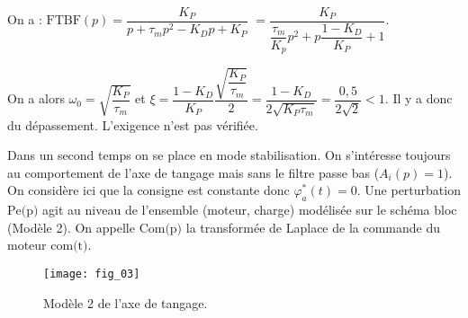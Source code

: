 \ifprof
\begin{corrige}
On a : $\text{FTBF}(p)=
\dfrac{K_P}{p+\tau_m p^2- K_Dp +K_P}$ 
$=\dfrac{K_P}{\dfrac{\tau_m}{K_p} p^2 + p\dfrac{1- K_D}{K_P} +1}$.

On a alors $\omega_0 = \sqrt{\dfrac{K_P}{\tau_m}}$ et $\xi = \dfrac{1- K_D}{K_P} \dfrac{\sqrt{\dfrac{K_P}{\tau_m}}}{2}= \dfrac{1- K_D}{2\sqrt{K_P \tau_m}}= \dfrac{0,5}{2\sqrt{2}} <1$. Il y a donc du dépassement. L'exigence n'est pas vérifiée. 
\end{corrige}
\else
\fi

\ifprof
\else

Dans un second temps on se place en mode stabilisation. On s’intéresse toujours au comportement de l’axe de
tangage mais sans le filtre passe bas ($A_i(p)=1$).
On considère ici que la consigne est constante donc $\varphi^*_a(t)=0$. Une perturbation $\text{Pe(p)}$ agit au niveau de l’ensemble (moteur, charge) modélisée sur le schéma bloc (Modèle 2). On appelle $\text{Com(p)}$ la transformée de Laplace de la commande du moteur $\text{com(t)}$.

\begin{figure}[H]
\texttt{[image: fig\_03]}

\caption{Modèle 2 de l’axe de tangage.}
\end{figure}
\fi

